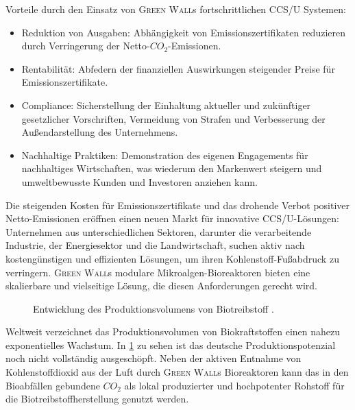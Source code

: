 Vorteile durch den Einsatz von \textsc{Green Wall}s fortschrittlichen CCS/U Systemen:

\begin{itemize}
    \item Reduktion von Ausgaben: Abhängigkeit von Emissionszertifikaten reduzieren durch Verringerung der Netto-\(CO_2\)-Emissionen.
    \item Rentabilität: Abfedern der finanziellen Auswirkungen steigender Preise für Emissionszertifikate.
    \item Compliance: Sicherstellung der Einhaltung aktueller und zukünftiger gesetzlicher Vorschriften, Vermeidung von Strafen und Verbesserung der Außendarstellung des Unternehmens.
    \item Nachhaltige Praktiken: Demonstration des eigenen Engagements für nachhaltiges Wirtschaften, was wiederum den Markenwert steigern und umweltbewusste Kunden und Investoren anziehen kann.
\end{itemize}

Die steigenden Kosten für Emissionszertifikate und das drohende Verbot positiver Netto-Emissionen eröffnen einen neuen Markt für innovative CCS/U-Lösungen: Unternehmen aus unterschiedlichen Sektoren, darunter die verarbeitende Industrie, der Energiesektor und die Landwirtschaft, suchen aktiv nach kostengünstigen und effizienten Lösungen, um ihren Kohlenstoff-Fußabdruck zu verringern.
\textsc{Green Wall}s modulare Mikroalgen-Bioreaktoren bieten eine skalierbare und vielseitige Lösung, die diesen Anforderungen gerecht wird.\par\medskip

\begin{figure}[h]
    \centering
    
    \caption[Entwicklung des Produktionsvolumens von Biotreibstoff]{Entwicklung des Produktionsvolumens von Biotreibstoff \cite{Statista2024.Biof.DE,Statista2024.Biof.EU,Statista2024.Biof.WW}.}\label{fig:biofuel production}
\end{figure}

Weltweit verzeichnet das Produktionsvolumen von Biokraftstoffen einen nahezu exponentielles Wachstum.
In \cref{fig:biofuel production} zu sehen ist das deutsche Produktionspotenzial noch nicht vollständig ausgeschöpft.
Neben der aktiven Entnahme von Kohlenstoffdioxid aus der Luft durch \textsc{Green Wall}s Bioreaktoren kann das in den Bioabfällen gebundene \(CO_2\) als lokal produzierter und hochpotenter Rohstoff für die Biotreibstoffherstellung genutzt werden.

